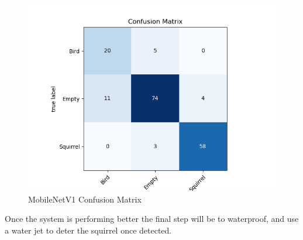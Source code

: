 \documentclass[conference]{IEEEtran}
\begin{document}
\begin{figure}[htbp]
\centerline{\includegraphics[scale=0.5]{MbNet_confMatrix.png}}
\caption{MobileNetV1 Confusion Matrix}
\label{MbNetV1ConfMat}
\end{figure}
Once the system is performing better the final step will be to waterproof, and use a water jet to deter the squirrel once detected.
\end{document}
